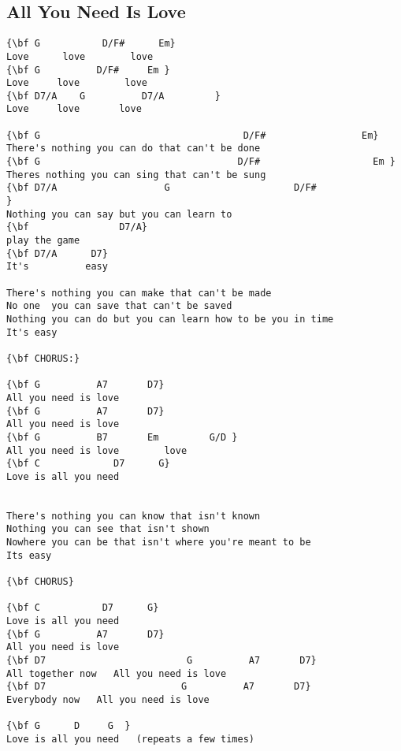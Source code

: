 \documentclass[a4paper]{article}
\begin{document}
\subsection{All You Need Is Love} %
\label{sub:All You Need is Love}
\begin{Verbatim}[commandchars=\\\{\}]
{\bf G           D/F#      Em}
Love      love        love     
{\bf G          D/F#     Em }
Love     love        love      
{\bf D7/A    G          D7/A         }
Love     love       love

{\bf G                                    D/F#                 Em}
There's nothing you can do that can't be done
{\bf G                                   D/F#                    Em }
Theres nothing you can sing that can't be sung
{\bf D7/A                   G                      D/F#                    }
Nothing you can say but you can learn to
{\bf                D7/A}
play the game
{\bf D7/A      D7}
It's          easy

There's nothing you can make that can't be made
No one  you can save that can't be saved
Nothing you can do but you can learn how to be you in time
It's easy

{\bf CHORUS:}

{\bf G          A7       D7}
All you need is love
{\bf G          A7       D7}
All you need is love
{\bf G          B7       Em         G/D }
All you need is love        love
{\bf C             D7      G}
Love is all you need


There's nothing you can know that isn't known
Nothing you can see that isn't shown
Nowhere you can be that isn't where you're meant to be
Its easy

{\bf CHORUS}

{\bf C           D7      G}
Love is all you need   
{\bf G          A7       D7}
All you need is love
{\bf D7                         G          A7       D7}
All together now   All you need is love
{\bf D7                        G          A7       D7}
Everybody now   All you need is love 

{\bf G      D     G  }
Love is all you need   (repeats a few times)
\end{Verbatim}
\newpage
\end{document}
